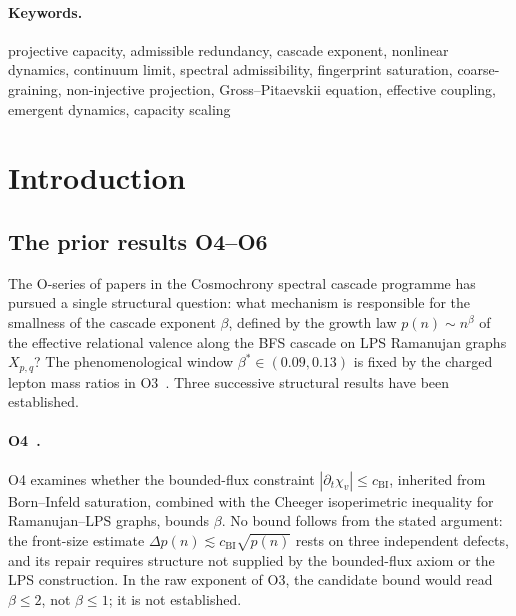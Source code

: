 \documentclass[11pt,a4paper]{article}
\theoremstyle{definition}
\theoremstyle{remark}
\begin{document}
\begin{abstract}
    The central identification $R_n^{(k)} \approx \Phi(\eta_n)$ is established exactly in the
    reduced model and supported numerically; its full graph-theoretic derivation is left as an open problem.
    This reframes the saturation results of O5--O6 as a positive convergence statement:
    admissible redundancy is not merely a combinatorial obstruction count, but the microscopic
    precursor of a continuous projective dynamics whose nonlinear structure is already
    determined by the framework.
  \end{abstract}

  \paragraph{Keywords.}
    projective capacity, admissible redundancy, cascade exponent, nonlinear dynamics, continuum limit,
    spectral admissibility, fingerprint saturation, coarse-graining, non-injective projection,
    Gross–Pitaevskii equation, effective coupling, emergent dynamics, capacity scaling

    \clearpage
    \tableofcontents

    \clearpage

  \section{Introduction}
  \label{sec:intro}

  \subsection{The prior results O4--O6}
    \label{ssec:hierarchy}

    The O-series of papers in the Cosmochrony spectral cascade programme has pursued a single
    structural question: what mechanism is responsible for the smallness of the cascade exponent
    $\beta$, defined by the growth law $p(n) \sim n^\beta$ of the effective relational valence
    along the BFS cascade on LPS Ramanujan graphs $X_{p,q}$?
    The phenomenological window $\beta^* \in (0.09, 0.13)$ is fixed by the charged lepton
    mass ratios in O3~\cite{Beau2026a7}.
    Three successive structural results have been established.

    \paragraph{O4~\cite{Beau2026a8}.}
      O4 examines whether the bounded-flux constraint $|\partial_t\chi_v| \leq c_{\mathrm{BI}}$, inherited
      from Born--Infeld saturation, combined with the Cheeger isoperimetric inequality for
      Ramanujan--LPS graphs, bounds $\beta$.
      No bound follows from the stated argument: the front-size estimate
      $\Delta p(n) \lesssim c_{\mathrm{BI}}\sqrt{p(n)}$ rests on three independent defects, and its repair
      requires structure not supplied by the bounded-flux axiom or the LPS construction.
      In the raw exponent of O3, the candidate bound would read $\beta \leq 2$, not $\beta \leq 1$; it is
      not established.
\end{document}
